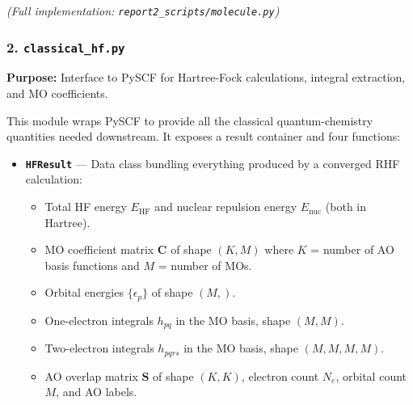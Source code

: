 \documentclass[
  11pt,
]{report}
\providecommand{\tightlist}{%
  \setlength{\itemsep}{0pt}\setlength{\parskip}{0pt}}
\begin{document}
\emph{(Full implementation: \texttt{report2\_scripts/molecule.py})}

\subsubsection{\texorpdfstring{2.
\texttt{classical\_hf.py}}{2. classical\_hf.py}}\label{classical_hf.py}

\textbf{Purpose:} Interface to PySCF for Hartree-Fock calculations,
integral extraction, and MO coefficients.

This module wraps PySCF to provide all the classical quantum-chemistry
quantities needed downstream. It exposes a result container and four
functions:

\begin{itemize}
\tightlist
\item
  \textbf{\texttt{HFResult}} --- Data class bundling everything produced
  by a converged RHF calculation:

  \begin{itemize}
  \tightlist
  \item
    Total HF energy \(E_{\text{HF}}\) and nuclear repulsion energy
    \(E_{\text{nuc}}\) (both in Hartree).
  \item
    MO coefficient matrix \(\mathbf{C}\) of shape \((K, M)\) where \(K\)
    = number of AO basis functions and \(M\) = number of MOs.
  \item
    Orbital energies \(\{\epsilon_p\}\) of shape \((M,)\).
  \item
    One-electron integrals \(h_{pq}\) in the MO basis, shape \((M, M)\).
  \item
    Two-electron integrals \(h_{pqrs}\) in the MO basis, shape
    \((M, M, M, M)\).
  \item
    AO overlap matrix \(\mathbf{S}\) of shape \((K, K)\), electron count
    \(N_e\), orbital count \(M\), and AO labels.
  \end{itemize}
\end{itemize}
\end{document}
